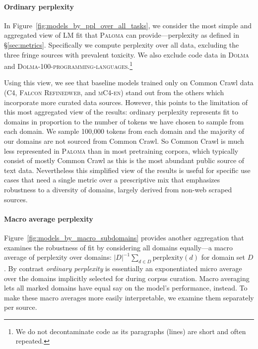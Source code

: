 \paragraph{Ordinary perplexity} In Figure~\ref{fig:models_by_ppl_over_all_tasks}, we consider the most simple and aggregated view of LM fit that \textsc{Paloma} can provide—perplexity as defined in \S\ref{sec:metrics}. Specifically we compute perplexity over all data, excluding the three fringe sources with prevalent toxicity. We also exclude code data in \textsc{Dolma} and \textsc{Dolma-100-programming-languages}.\footnote{We do not decontaminate code as its paragraphs (lines) are short and often repeated.}

Using this view, we see that baseline models trained only on Common Crawl data (\textsc{C4}, \textsc{Falcon Refinedweb}, and \textsc{mC4-en}) stand out from the others which incorporate more curated data sources. However, this points to the limitation of this most aggregated view of the results: ordinary perplexity represents fit to domains in proportion to the number of tokens we have chosen to sample from each domain. We sample 100,000 tokens from each domain and the majority of our domains are not sourced from Common Crawl. So Common Crawl is much less represented in \textsc{Paloma} than in most pretraining corpora, which typically consist of mostly Common Crawl as this is the most abundant public source of text data. Nevertheless this simplified view of the results is useful for specific use cases that need a single metric over a prescriptive mix that emphasizes robustness to a diversity of domains, largely derived from non-web scraped sources.

\paragraph{Macro average perplexity} Figure~\ref{fig:models_by_macro_subdomains}
provides another aggregation that examines the robustness of fit by considering all domains equally—a macro average of perplexity over domains: $|D|^{-1}\sum_{d\in D} \text{perplexity}(d)$ for domain set $D$. By contrast \textit{ordinary perplexity} is essentially an exponentiated micro average over the domains implicitly selected for during corpus curation. Macro averaging lets all marked domains have equal say on the model's performance, instead. To make these macro averages more easily interpretable, we examine them separately per source.

